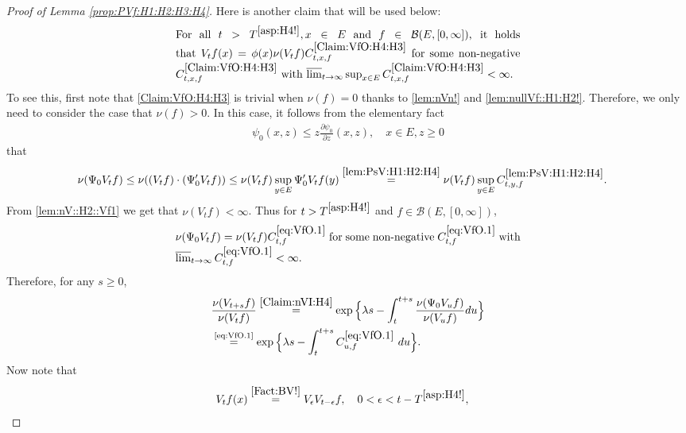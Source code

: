 \documentclass[12pt,a4paper]{amsart}
\numberwithin{equation}{section}
\theoremstyle{plain}
\theoremstyle{definition}
\theoremstyle{remark}
\begin{document}
\begin{proof}[Proof of Lemma \ref{prop:PVf:H1:H2:H3:H4}]
	Here is another claim that will be used below:
\begin{equation}
\begin{minipage}{0.9\textwidth}
	For all $t> T^{\eqref{asp:H4!}}, x\in E$ and $f\in \mathcal B(E,[0,\infty])$, it holds that $V_t f(x) = \phi(x) \nu(V_tf) C^{\eqref{Claim:VfO:H4:H3}}_{t,x,f}$ for some non-negative $C^{\eqref{Claim:VfO:H4:H3}}_{t,x,f}$ with $\varlimsup_{t\to \infty} \sup_{x\in E} C^{\eqref{Claim:VfO:H4:H3}}_{t,x,f} <\infty$.
\end{minipage} \label{Claim:VfO:H4:H3}
\end{equation}
	To see this, first note that \eqref{Claim:VfO:H4:H3} is trivial when $\nu(f) = 0$ thanks to \eqref{lem:nVn!} and \eqref{lem:nullVf::H1:H2!}. 
	Therefore, we only need to consider the case that $\nu(f)>0$.
	In this case, it follows from the elementary fact
\begin{align}\label{e:derofpsi0}
	\psi_0(x,z)
	\leq z \frac{\partial \psi_0}{\partial z}(x,z),
	\quad x\in E, z\geq 0
\end{align}
	that
\begin{align}
	&\nu(\Psi_0 V_tf)
	\leq \nu((V_tf)\cdot (\Psi_0' V_tf)) \leq \nu(V_tf) \sup_{y\in E} \Psi_0' V_tf(y)
	\overset{\eqref{lem:PsV:H1:H2:H4}}= \nu(V_tf) \sup_{y\in E} C^{\eqref{lem:PsV:H1:H2:H4}}_{t,y,f}.
\end{align}
	From \eqref{lem:nV::H2::Vf1}  we get that $\nu(V_tf) <\infty$.
	Thus for $t> T^{\eqref{asp:H4!}}$ and $f\in \mathcal B(E,[0,\infty])$,
\begin{equation}
\begin{minipage}{0.9\textwidth}
	$\nu(\Psi_0 V_t f)  = \nu(V_tf) C^{\eqref{eq:VfO.1}}_{t,f}$	for some non-negative $C^{\eqref{eq:VfO.1}}_{t,f} $ with $\varlimsup_{t\to \infty} C^{\eqref{eq:VfO.1}}_{t,f}  < \infty$.
\end{minipage}\label{eq:VfO.1}
\end{equation}
	Therefore, for any $s\geq 0$,
\begin{align}
	&  \frac{\nu(V_{t+s} f)} {\nu(V_t f)} \overset{\eqref{Claim:nVI:H4}}= \exp\Big\{ \lambda s - \int_t^{t+s} \frac{\nu(\Psi_0 V_u f) }{\nu(V_u f)} du\Big\}
	\\&\label{eq:VfO.2} \overset{\text{\eqref{eq:VfO.1}}}= \exp\Big\{ \lambda s - \int_t^{t+s} C^{\eqref{eq:VfO.1}}_{u,f} ~du\Big\}.
\end{align}
	Now note that
\begin{align}
	&V_{t}f(x) \overset{\eqref{Fact:BV!}}= V_{\epsilon} V_{t-\epsilon} f , \quad 0<\epsilon < t- T^{\eqref{asp:H4!}} ,

\end{align}
\end{proof}
\end{document}
